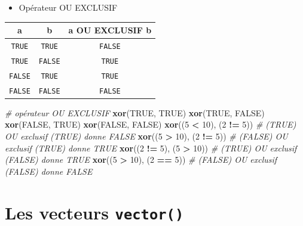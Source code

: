 \documentclass[
]{book}
\newenvironment{Shaded}{\begin{snugshade}}{\end{snugshade}}
\newcommand{\CommentTok}[1]{\textcolor[rgb]{0.56,0.35,0.01}{\textit{#1}}}
\newcommand{\ConstantTok}[1]{\textcolor[rgb]{0.56,0.35,0.01}{#1}}
\newcommand{\DecValTok}[1]{\textcolor[rgb]{0.00,0.00,0.81}{#1}}
\newcommand{\FunctionTok}[1]{\textcolor[rgb]{0.13,0.29,0.53}{\textbf{#1}}}
\newcommand{\NormalTok}[1]{#1}
\newcommand{\SpecialCharTok}[1]{\textcolor[rgb]{0.81,0.36,0.00}{\textbf{#1}}}
\providecommand{\tightlist}{%
  \setlength{\itemsep}{0pt}\setlength{\parskip}{0pt}}
\begin{document}
\begin{itemize}
\tightlist
\item
  Opérateur OU EXCLUSIF
\end{itemize}

\begin{longtable}[]{@{}ccc@{}}
\toprule\noalign{}
a & b & a OU EXCLUSIF b \\
\midrule\noalign{}
\endhead
\bottomrule\noalign{}
\endlastfoot
\texttt{TRUE} & \texttt{TRUE} & \texttt{FALSE} \\
\texttt{TRUE} & \texttt{FALSE} & \texttt{TRUE} \\
\texttt{FALSE} & \texttt{TRUE} & \texttt{TRUE} \\
\texttt{FALSE} & \texttt{FALSE} & \texttt{FALSE} \\
\end{longtable}

\begin{Shaded}
\begin{Highlighting}[]
\CommentTok{\# opérateur OU EXCLUSIF}
\FunctionTok{xor}\NormalTok{(}\ConstantTok{TRUE}\NormalTok{, }\ConstantTok{TRUE}\NormalTok{)}
\FunctionTok{xor}\NormalTok{(}\ConstantTok{TRUE}\NormalTok{, }\ConstantTok{FALSE}\NormalTok{)}
\FunctionTok{xor}\NormalTok{(}\ConstantTok{FALSE}\NormalTok{, }\ConstantTok{TRUE}\NormalTok{)}
\FunctionTok{xor}\NormalTok{(}\ConstantTok{FALSE}\NormalTok{, }\ConstantTok{FALSE}\NormalTok{)}
\FunctionTok{xor}\NormalTok{((}\DecValTok{5} \SpecialCharTok{\textless{}} \DecValTok{10}\NormalTok{), (}\DecValTok{2} \SpecialCharTok{!=} \DecValTok{5}\NormalTok{)) }\CommentTok{\# (TRUE) OU exclusif (TRUE) donne FALSE}
\FunctionTok{xor}\NormalTok{((}\DecValTok{5} \SpecialCharTok{\textgreater{}} \DecValTok{10}\NormalTok{), (}\DecValTok{2} \SpecialCharTok{!=} \DecValTok{5}\NormalTok{)) }\CommentTok{\# (FALSE) OU exclusif (TRUE) donne TRUE}
\FunctionTok{xor}\NormalTok{((}\DecValTok{2} \SpecialCharTok{!=} \DecValTok{5}\NormalTok{), (}\DecValTok{5} \SpecialCharTok{\textgreater{}} \DecValTok{10}\NormalTok{)) }\CommentTok{\# (TRUE) OU exclusif (FALSE) donne TRUE}
\FunctionTok{xor}\NormalTok{((}\DecValTok{5} \SpecialCharTok{\textgreater{}} \DecValTok{10}\NormalTok{), (}\DecValTok{2} \SpecialCharTok{==} \DecValTok{5}\NormalTok{)) }\CommentTok{\# (FALSE) OU exclusif (FALSE) donne FALSE}
\end{Highlighting}
\end{Shaded}

\section{\texorpdfstring{Les vecteurs \texttt{vector()}}{Les vecteurs vector()}}\label{les-vecteurs-vector}
\end{document}
